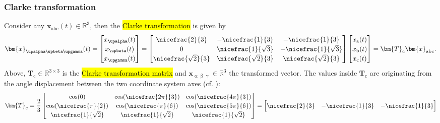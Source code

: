 \begin{frame}
    \frametitle{Clarke transformation}
    Consider any $\bm{x}_\mathrm{abc}(t)\in\mathbb{R}^3$, then the \hl{Clarke transformation} is given by
    \begin{equation}
        \renewcommand{\arraystretch}{1.2}
        \bm{x}_{\upalpha \upbeta \upgamma}(t) = \begin{bmatrix} x_\upalpha(t) \\ x_\upbeta(t) \\ x_\upgamma(t)\end{bmatrix} = \begin{bmatrix}
            \nicefrac{2}{3}        & -\nicefrac{1}{3}       & -\nicefrac{1}{3}        \\
            0                      & \nicefrac{1}{\sqrt{3}} & -\nicefrac{1}{\sqrt{3}} \\
            \nicefrac{\sqrt{2}}{3} & \nicefrac{\sqrt{2}}{3} & \nicefrac{\sqrt{2}}{3}
        \end{bmatrix} \begin{bmatrix} x_\mathrm{a}(t) \\ x_\mathrm{b}(t) \\ x_\mathrm{c}(t)\end{bmatrix} = \bm{T}_\mathrm{c} \bm{x}_\mathrm{abc}.
        \label{eq:Clarke_transformation}
    \end{equation}
    Above, $\bm{T}_\mathrm{c}\in\mathbb{R}^{3\times 3}$ is the \hl{Clarke transformation matrix} and $\bm{x}_\mathrm{\upalpha \upbeta \upgamma}\in\mathbb{R}^3$ the transformed vector. \pause The values inside $\bm{T}_\mathrm{c}$ are originating from the angle displacement between the two coordinate system axes (cf. ):
    \begin{equation}
        \renewcommand{\arraystretch}{1.2}
        \bm{T}_\mathrm{c} = \frac{2}{3}\begin{bmatrix}
            \cos(0)                 & \cos(\nicefrac{2\pi}{3}) & \cos(\nicefrac{4\pi}{3}) \\
            \cos(\nicefrac{\pi}{2}) & \cos(\nicefrac{\pi}{6})  & \cos(\nicefrac{5\pi}{6})
            \\ \nicefrac{1}{\sqrt{2}} & \nicefrac{1}{\sqrt{2}} & \nicefrac{1}{\sqrt{2}}\end{bmatrix} = \begin{bmatrix}
            \nicefrac{2}{3}        & -\nicefrac{1}{3}       & -\nicefrac{1}{3}        \\

\end{bmatrix}
\end{equation}
\end{frame}
